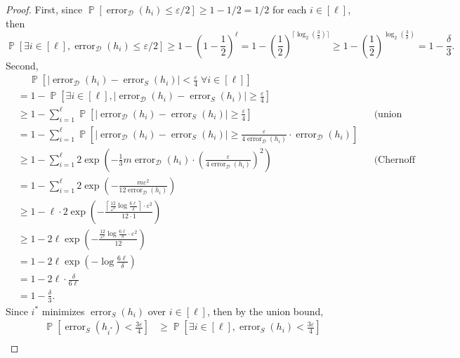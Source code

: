 \documentclass[letterpaper, reqno,11pt]{article}
\newcommand{\PP}{\mathop{{}\mathbb{P}}}
\DeclareMathOperator{\error}{error}
\begin{document}
\begin{enumerate}
\begin{proof}
    First, since $\PP[\error_{\mathcal D}(h_i) \leq \varepsilon/2] \geq 1 - 1/2 = 1/2$ for each $i \in [\ell]$, then
    $$ \PP\left[\exists i \in [\ell], \error_{\mathcal D}(h_i) \leq \varepsilon/2\right] \geq 1 - \left(1 - \frac{1}{2}\right)^\ell = 1 - \left(\frac{1}{2}\right)^{\lceil\log_2 \left(\frac{3}{\delta}\right) \rceil} \geq 1 - \left(\frac{1}{2}\right)^{\log_2 \left(\frac{3}{\delta}\right)} = 1 - \frac{\delta}{3}. $$
    Second,
    \begin{align*}
      &\quad\, \PP\left[\left|\error_{\mathcal D}\left(h_i\right) - \error_S\left(h_i\right)\right| < \frac{\varepsilon}{4} \; \forall i \in [\ell]\right] \\
      &= 1 - \PP\left[\exists i \in [\ell], \left|\error_{\mathcal D}\left(h_i\right) - \error_S\left(h_i\right)\right| \geq \frac{\varepsilon}{4}\right] \\
      &\geq 1 - \sum_{i = 1}^\ell \PP\left[\left|\error_{\mathcal D}\left(h_i\right) - \error_S\left(h_i\right)\right| \geq \frac{\varepsilon}{4}\right] && \text{(union bound)} \\
      &= 1 - \sum_{i = 1}^\ell \PP\left[\left|\error_{\mathcal D}\left(h_i\right) - \error_S\left(h_i\right)\right| \geq \frac{\varepsilon}{4\error_{\mathcal D}\left(h_i\right)} \cdot \error_{\mathcal D}\left(h_i\right)\right] \\
      &\geq 1 - \sum_{i = 1}^\ell 2\exp\left(-\frac{1}{3} m\error_{\mathcal D}\left(h_i\right) \cdot \left(\frac{\varepsilon}{4\error_{\mathcal D}\left(h_i\right)}\right)^2\right) && \text{(Chernoff bound)} \\
      &= 1 - \sum_{i = 1}^\ell 2\exp\left(-\frac{m\varepsilon^2}{12 \error_{\mathcal D}\left(h_i\right)}\right) \\
      &\geq 1 - \ell \cdot 2\exp\left(-\frac{\left\lceil\frac{12}{\varepsilon^2} \log \frac{6\ell}{\delta}\right\rceil \cdot \varepsilon^2}{12 \cdot 1}\right) \\
      &\geq 1 - 2\ell\exp\left(-\frac{\frac{12}{\varepsilon^2} \log \frac{6\ell}{\delta} \cdot \varepsilon^2}{12}\right) \\
      &= 1 - 2\ell\exp\left(-\log \frac{6\ell}{\delta}\right) \\
      &= 1 - 2\ell \cdot \frac{\delta}{6\ell} \\
      &= 1 - \frac{\delta}{3}.
    \end{align*}
    Since $i^*$ minimizes $\error_S(h_i)$ over $i \in [\ell]$, then by the union bound,
    \begin{align*}
      \PP\left[\error_S\left(h_{i^*}\right) < \frac{3\varepsilon}{4}\right] &\geq \PP\left[\exists i \in [\ell], \error_S\left(h_i\right) < \frac{3\varepsilon}{4}\right] \\

\end{align*}
\end{proof}
\end{enumerate}
\end{document}
